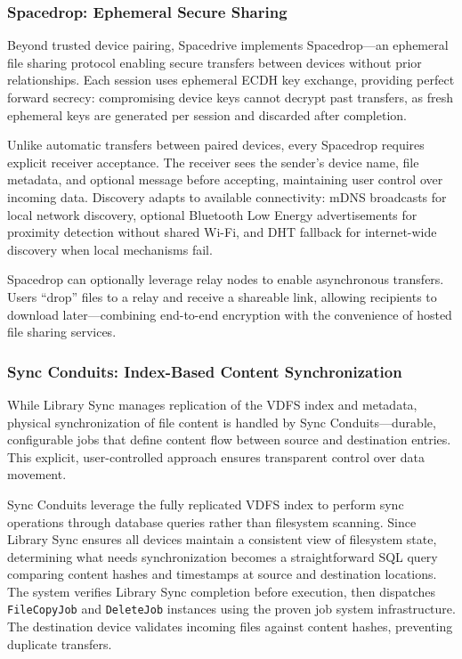 \documentclass[sigconf]{acmart}
\begin{document}
\subsubsection{Spacedrop: Ephemeral Secure Sharing}

Beyond trusted device pairing, Spacedrive implements Spacedrop---an ephemeral file sharing protocol enabling secure transfers between devices without prior relationships. Each session uses ephemeral ECDH key exchange, providing perfect forward secrecy: compromising device keys cannot decrypt past transfers, as fresh ephemeral keys are generated per session and discarded after completion.

Unlike automatic transfers between paired devices, every Spacedrop requires explicit receiver acceptance. The receiver sees the sender's device name, file metadata, and optional message before accepting, maintaining user control over incoming data. Discovery adapts to available connectivity: mDNS broadcasts for local network discovery, optional Bluetooth Low Energy advertisements for proximity detection without shared Wi-Fi, and DHT fallback for internet-wide discovery when local mechanisms fail.

Spacedrop can optionally leverage relay nodes to enable asynchronous transfers. Users ``drop'' files to a relay and receive a shareable link, allowing recipients to download later---combining end-to-end encryption with the convenience of hosted file sharing services.

\subsubsection{Sync Conduits: Index-Based Content Synchronization}
\label{sec:sync-conduits}

While Library Sync manages replication of the VDFS index and metadata, physical synchronization of file content is handled by Sync Conduits---durable, configurable jobs that define content flow between source and destination entries. This explicit, user-controlled approach ensures transparent control over data movement.

Sync Conduits leverage the fully replicated VDFS index to perform sync operations through database queries rather than filesystem scanning. Since Library Sync ensures all devices maintain a consistent view of filesystem state, determining what needs synchronization becomes a straightforward SQL query comparing content hashes and timestamps at source and destination locations. The system verifies Library Sync completion before execution, then dispatches \texttt{FileCopyJob} and \texttt{DeleteJob} instances using the proven job system infrastructure. The destination device validates incoming files against content hashes, preventing duplicate transfers.
\end{document}
